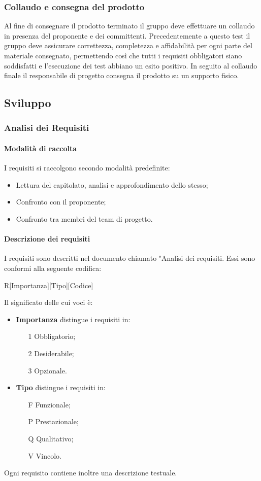 \subsubsection{Collaudo e consegna del prodotto}
Al fine di consegnare il prodotto terminato il gruppo deve effettuare un collaudo in presenza del proponente e dei committenti. Precedentemente a questo test il gruppo deve assicurare correttezza, completezza e affidabilità per ogni parte del materiale consegnato, permettendo così che tutti i requisiti obbligatori siano soddisfatti e l'esecuzione dei test abbiano un esito positivo. In seguito al collaudo finale il responsabile di progetto consegna il prodotto su un supporto fisico.                  
\subsection{Sviluppo}
\subsubsection{Analisi dei Requisiti}
\paragraph{Modalità di raccolta}
I requisiti si raccolgono secondo modalità predefinite:
\begin{itemize}
	\item Lettura del capitolato, analisi e approfondimento dello stesso;
	\item Confronto con il proponente;
	\item Confronto tra membri del team di progetto.
\end{itemize}
\paragraph{Descrizione dei requisiti}
I requisiti sono descritti nel documento chiamato "Analisi dei
requisiti. Essi sono conformi alla seguente codifica:\newline
\centerline{R[Importanza][Tipo][Codice]}\newline
Il significato delle cui voci è:
\begin{itemize}
	\item \textbf{Importanza} distingue i requisiti in:
	\begin{itemize}
		\item[1] Obbligatorio;
		\item[2] Desiderabile;
		\item[3] Opzionale.
	\end{itemize}
	\item \textbf{Tipo} distingue i requisiti in:
	\begin{itemize}
		\item[F] Funzionale;
		\item[P] Prestazionale;
		\item[Q] Qualitativo;
		\item[V] Vincolo.
	\end{itemize}
\end{itemize}
Ogni requisito contiene inoltre una descrizione testuale.
